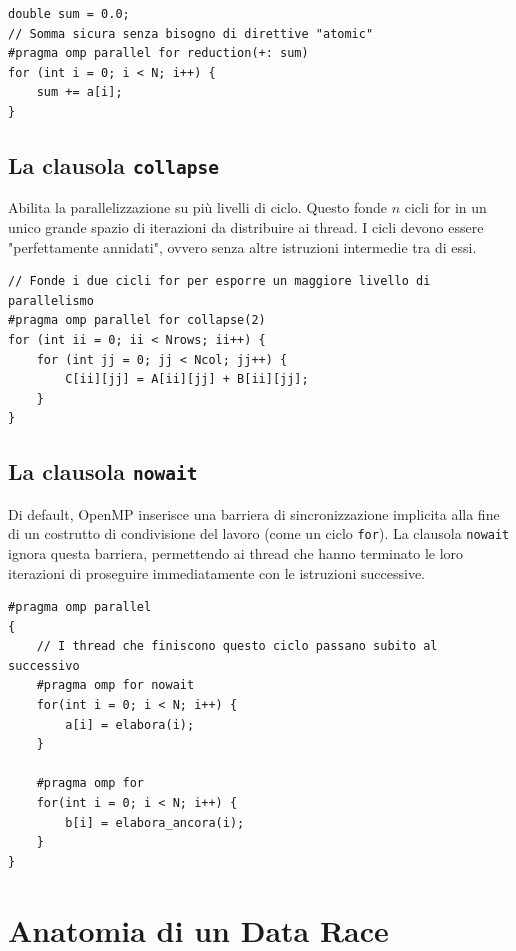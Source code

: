 \begin{verbatim}
double sum = 0.0;
// Somma sicura senza bisogno di direttive "atomic"
#pragma omp parallel for reduction(+: sum)
for (int i = 0; i < N; i++) {
    sum += a[i];
}
\end{verbatim}

\subsection{La clausola \texttt{collapse}}
Abilita la parallelizzazione su più livelli di ciclo. Questo fonde $n$ cicli for in un unico grande spazio di iterazioni da distribuire ai thread. I cicli devono essere "perfettamente annidati", ovvero senza altre istruzioni intermedie tra di essi.

\begin{verbatim}
// Fonde i due cicli for per esporre un maggiore livello di parallelismo
#pragma omp parallel for collapse(2)
for (int ii = 0; ii < Nrows; ii++) {
    for (int jj = 0; jj < Ncol; jj++) {
        C[ii][jj] = A[ii][jj] + B[ii][jj]; 
    }
}
\end{verbatim}

\subsection{La clausola \texttt{nowait}}
Di default, OpenMP inserisce una barriera di sincronizzazione implicita alla fine di un costrutto di condivisione del lavoro (come un ciclo \texttt{for}). La clausola \texttt{nowait} ignora questa barriera, permettendo ai thread che hanno terminato le loro iterazioni di proseguire immediatamente con le istruzioni successive.

\begin{verbatim}
#pragma omp parallel
{
    // I thread che finiscono questo ciclo passano subito al successivo
    #pragma omp for nowait
    for(int i = 0; i < N; i++) { 
        a[i] = elabora(i); 
    }

    #pragma omp for
    for(int i = 0; i < N; i++) { 
        b[i] = elabora_ancora(i); 
    }
}
\end{verbatim}

\section{Anatomia di un Data Race}


